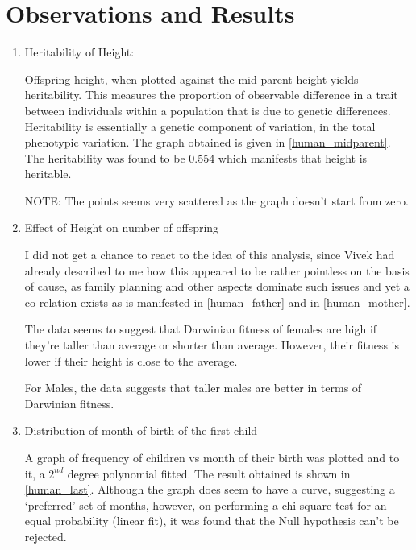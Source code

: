\section{Observations and Results}
	\begin{enumerate}
		\item 
			Heritability of Height:
			\par
			Offspring height, when plotted against the mid-parent height yields heritability. This measures the proportion of observable difference in a trait between individuals within a population that is due to genetic differences. Heritability is essentially a genetic component of variation, in the total phenotypic variation. The graph obtained is given in \autoref{human_midparent}. The heritability was found to be 0.554 which manifests that height is heritable.
			\par
			NOTE: The points seems very scattered as the graph doesn't start from zero.
		\item 
			Effect of Height on number of offspring
			\par
			I did not get a chance to react to the idea of this analysis, since Vivek had already described to me how this appeared to be rather pointless on the basis of cause, as family planning and other aspects dominate such issues and yet a co-relation exists as is manifested in \autoref{human_father} and in \autoref{human_mother}. 
			\par
			The data seems to suggest that Darwinian fitness of females are high if they're taller than average or shorter than average. However, their fitness is lower if their height is close to the average. 
			\par
			For Males, the data suggests that taller males are better in terms of Darwinian fitness.
		\item
			Distribution of month of birth of the first child
			\par
			A graph of frequency of children vs month of their birth was plotted and to it, a $2^{nd}$ degree polynomial fitted. The result obtained is shown in \autoref{human_last}. Although the graph does seem to have a curve, suggesting a `preferred' set of months, however, on performing a chi-square test for an equal probability (linear fit), it was found that the Null hypothesis can't be rejected.
	\end{enumerate}


